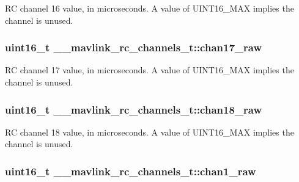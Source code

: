 R\+C channel 16 value, in microseconds. A value of U\+I\+N\+T16\+\_\+\+M\+A\+X implies the channel is unused. 

\hypertarget{struct____mavlink__rc__channels__t_a8a12c6951b2b98bed314dc150a0b3717}{
\subsubsection[{chan17\+\_\+raw}]{\setlength{\rightskip}{0pt plus 5cm}uint16\+\_\+t \+\_\+\+\_\+mavlink\+\_\+rc\+\_\+channels\+\_\+t\+::chan17\+\_\+raw}}\label{struct____mavlink__rc__channels__t_a8a12c6951b2b98bed314dc150a0b3717}


R\+C channel 17 value, in microseconds. A value of U\+I\+N\+T16\+\_\+\+M\+A\+X implies the channel is unused. 

\hypertarget{struct____mavlink__rc__channels__t_aca5ac7a138aeac9df125ee52cefa540e}{
\subsubsection[{chan18\+\_\+raw}]{\setlength{\rightskip}{0pt plus 5cm}uint16\+\_\+t \+\_\+\+\_\+mavlink\+\_\+rc\+\_\+channels\+\_\+t\+::chan18\+\_\+raw}}\label{struct____mavlink__rc__channels__t_aca5ac7a138aeac9df125ee52cefa540e}


R\+C channel 18 value, in microseconds. A value of U\+I\+N\+T16\+\_\+\+M\+A\+X implies the channel is unused. 

\hypertarget{struct____mavlink__rc__channels__t_a443cc0fbb7f76e0dc68f91a1f5aad6b7}{
\subsubsection[{chan1\+\_\+raw}]{\setlength{\rightskip}{0pt plus 5cm}uint16\+\_\+t \+\_\+\+\_\+mavlink\+\_\+rc\+\_\+channels\+\_\+t\+::chan1\+\_\+raw}}\label{struct____mavlink__rc__channels__t_a443cc0fbb7f76e0dc68f91a1f5aad6b7}


